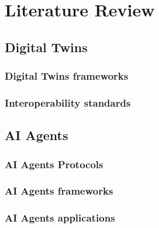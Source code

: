 \chapter{Literature Review}
\label{chap:literature}

\section{Digital Twins}

\subsection{Digital Twins frameworks}

\subsection{Interoperability standards}

\section{AI Agents}

\subsection{AI Agents Protocols}

\subsection{AI Agents frameworks}

\subsection{AI Agents applications}

